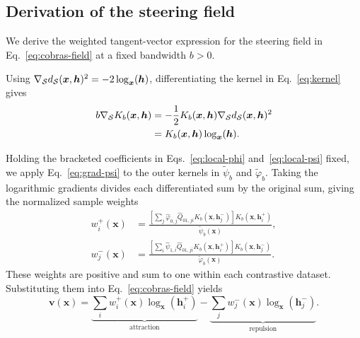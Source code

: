 \subsection{Derivation of the steering field}
\label{app:grad-psi}

We derive the weighted tangent-vector expression for the steering field in Eq.~\eqref{eq:cobras-field} at a fixed bandwidth $b>0$.

Using $\nabla_{\mathcal{S}} d_{\mathcal{S}}(\boldsymbol{x},\boldsymbol{h})^2=-2\log_{\boldsymbol{x}}(\boldsymbol{h})$, differentiating the kernel in Eq.~\eqref{eq:kernel} gives
\begin{equation}
\begin{aligned}
b\nabla_{\mathcal{S}} K_b(\boldsymbol{x},\boldsymbol{h})
&=-\frac{1}{2}K_b(\boldsymbol{x},\boldsymbol{h})\nabla_{\mathcal{S}} d_{\mathcal{S}}(\boldsymbol{x},\boldsymbol{h})^2\\
&=K_b(\boldsymbol{x},\boldsymbol{h})\log_{\boldsymbol{x}}(\boldsymbol{h}).
\end{aligned}
\label{eq:grad-psi}
\end{equation}

Holding the bracketed coefficients in Eqs.~\eqref{eq:local-phi} and~\eqref{eq:local-psi} fixed, we apply Eq.~\eqref{eq:grad-psi} to the outer kernels in $\widetilde{\psi}_b$ and $\widetilde{\varphi}_b$. Taking the logarithmic gradients divides each differentiated sum by the original sum, giving the normalized sample weights
\begin{align}
w_i^+(\boldsymbol{x})
&=\frac{\left[\sum_j\widehat{\varphi}_{0,j}\widehat{Q}_{01,ji}K_b(\boldsymbol{x},\boldsymbol{h}_j^-)\right]K_b(\boldsymbol{x},\boldsymbol{h}_i^+)}
{\widetilde{\psi}_b(\boldsymbol{x})},
\label{eq:weights-pos}\\
w_j^-(\boldsymbol{x})
&=\frac{\left[\sum_i\widehat{\psi}_{1,i}\widehat{Q}_{01,ji}K_b(\boldsymbol{x},\boldsymbol{h}_i^+)\right]K_b(\boldsymbol{x},\boldsymbol{h}_j^-)}
{\widetilde{\varphi}_b(\boldsymbol{x})}.
\label{eq:weights-neg}
\end{align}
These weights are positive and sum to one within each contrastive dataset. Substituting them into Eq.~\eqref{eq:cobras-field} yields
\begin{equation}
\boldsymbol{v}(\boldsymbol{x})
=\underbrace{\sum_i w_i^+(\boldsymbol{x})\log_{\boldsymbol{x}}(\boldsymbol{h}_i^+)}_{\text{attraction}}
-\underbrace{\sum_j w_j^-(\boldsymbol{x})\log_{\boldsymbol{x}}(\boldsymbol{h}_j^-)}_{\text{repulsion}}.
\label{eq:weighted-cobras-field}
\end{equation}

